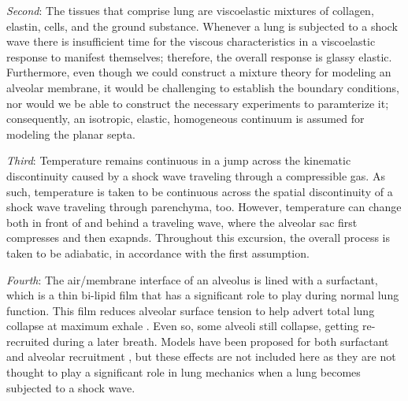 \textit{Second\/}: The tissues that comprise lung are visco\-elastic \cite{Hildebrandt69,HoppinHildebrandt77} mixtures of collagen, elastin, cells, and the ground substance. \cite{RoanWaters11,Sukietal11}  Whenever a lung is subjected to a shock wave there is insufficient time for the viscous characteristics in a visco\-elastic response to manifest themselves; therefore, the overall response is glassy elastic.  Furthermore, even though we could construct a mixture theory for modeling an alveolar membrane, it would be challenging to establish the boundary conditions, nor would we be able to construct the necessary experiments to paramterize it; consequently, an isotropic, elastic, homogeneous continuum is assumed for modeling the planar septa.

\textit{Third\/}: Temperature remains continuous in a jump across the kinematic discontinuity caused by a shock wave traveling through a compressible gas. \cite{AmesStaff53} As such, temperature is taken to be continuous across the spatial discontinuity of a shock wave traveling through parenchyma, too.  However, temperature can change both in front of and behind a traveling wave, where the alveolar sac first compresses and then exapnds.  Throughout this excursion, the overall process is taken to be adiabatic, in accordance with the first assumption.

\textit{Fourth\/}: The air\slash membrane interface of an alveolus is lined with a surfactant, which is a thin bi-lipid film that has a significant role to play during normal lung function.  This film reduces alveolar surface tension to help advert total lung collapse at maximum exhale \cite{Stamenovic90}.  Even so, some alveoli still collapse, getting re-recruited during a later breath.  Models have been proposed for both surfactant \cite{Hills99} and alveolar recruitment \cite{Bates07}, but these effects are not included here as they are not thought to play a significant role in lung mechanics when a lung becomes subjected to a shock wave. 

